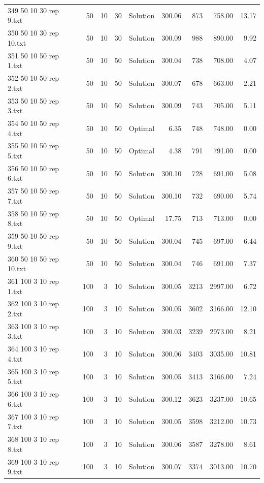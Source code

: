 \begin{longtable}{lrrllrrrr}
349 50 10 30 rep 9.txt & 50 & 10 & 30 & Solution & 300.06 & 873 & 758.00 & 13.17\\
350 50 10 30 rep 10.txt & 50 & 10 & 30 & Solution & 300.09 & 988 & 890.00 &  9.92\\
351 50 10 50 rep 1.txt & 50 & 10 & 50 & Solution & 300.04 & 738 & 708.00 &  4.07\\
352 50 10 50 rep 2.txt & 50 & 10 & 50 & Solution & 300.07 & 678 & 663.00 &  2.21\\
353 50 10 50 rep 3.txt & 50 & 10 & 50 & Solution & 300.09 & 743 & 705.00 &  5.11\\
354 50 10 50 rep 4.txt & 50 & 10 & 50 & Optimal &  6.35 & 748 & 748.00 &  0.00\\
355 50 10 50 rep 5.txt & 50 & 10 & 50 & Optimal &  4.38 & 791 & 791.00 &  0.00\\
356 50 10 50 rep 6.txt & 50 & 10 & 50 & Solution & 300.10 & 728 & 691.00 &  5.08\\
357 50 10 50 rep 7.txt & 50 & 10 & 50 & Solution & 300.10 & 732 & 690.00 &  5.74\\
358 50 10 50 rep 8.txt & 50 & 10 & 50 & Optimal & 17.75 & 713 & 713.00 &  0.00\\
359 50 10 50 rep 9.txt & 50 & 10 & 50 & Solution & 300.04 & 745 & 697.00 &  6.44\\
360 50 10 50 rep 10.txt & 50 & 10 & 50 & Solution & 300.04 & 746 & 691.00 &  7.37\\
361 100 3 10 rep 1.txt & 100 & 3 & 10 & Solution & 300.05 & 3213 & 2997.00 &  6.72\\
362 100 3 10 rep 2.txt & 100 & 3 & 10 & Solution & 300.05 & 3602 & 3166.00 & 12.10\\
363 100 3 10 rep 3.txt & 100 & 3 & 10 & Solution & 300.03 & 3239 & 2973.00 &  8.21\\
364 100 3 10 rep 4.txt & 100 & 3 & 10 & Solution & 300.06 & 3403 & 3035.00 & 10.81\\
365 100 3 10 rep 5.txt & 100 & 3 & 10 & Solution & 300.05 & 3413 & 3166.00 &  7.24\\
366 100 3 10 rep 6.txt & 100 & 3 & 10 & Solution & 300.12 & 3623 & 3237.00 & 10.65\\
367 100 3 10 rep 7.txt & 100 & 3 & 10 & Solution & 300.05 & 3598 & 3212.00 & 10.73\\
368 100 3 10 rep 8.txt & 100 & 3 & 10 & Solution & 300.06 & 3587 & 3278.00 &  8.61\\
369 100 3 10 rep 9.txt & 100 & 3 & 10 & Solution & 300.07 & 3374 & 3013.00 & 10.70\\
\end{longtable}

